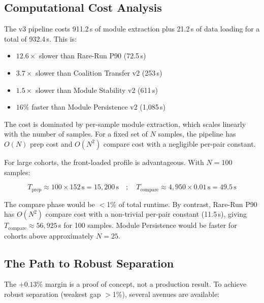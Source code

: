 \documentclass{../yalumba}
\begin{document}
\subsection{Computational Cost Analysis}

The v3 pipeline costs 911.2\,s of module extraction plus 21.2\,s of data
loading for a total of 932.4\,s.  This is:

\begin{itemize}
  \item $12.6\times$ slower than Rare-Run P90 (72.5\,s)
  \item $3.7\times$ slower than Coalition Transfer v2 (253\,s)
  \item $1.5\times$ slower than Module Stability v2 (611\,s)
  \item $16\%$ faster than Module Persistence v2 (1{,}085\,s)
\end{itemize}

The cost is dominated by per-sample module extraction, which scales linearly
with the number of samples.  For a fixed set of $N$ samples, the pipeline
has $O(N)$ prep cost and $O(N^2)$ compare cost with a negligible per-pair
constant.

For large cohorts, the front-loaded profile is advantageous.  With $N = 100$
samples:

\begin{equation}
  T_{\text{prep}} \approx 100 \times 152\,\text{s} = 15{,}200\,\text{s}
  \quad;\quad
  T_{\text{compare}} \approx 4{,}950 \times 0.01\,\text{s} = 49.5\,\text{s}
  \label{eq:scaling}
\end{equation}

The compare phase would be $<$1\% of total runtime.  By contrast, Rare-Run
P90 has $O(N^2)$ compare cost with a non-trivial per-pair constant (11.5\,s),
giving $T_{\text{compare}} \approx 56{,}925$\,s for 100 samples.  Module
Persistence would be faster for cohorts above approximately $N = 25$.

\subsection{The Path to Robust Separation}

The $+0.13\%$ margin is a proof of concept, not a production result.  To
achieve robust separation (weakest gap $>$1\%), several avenues are
available:
\end{document}
